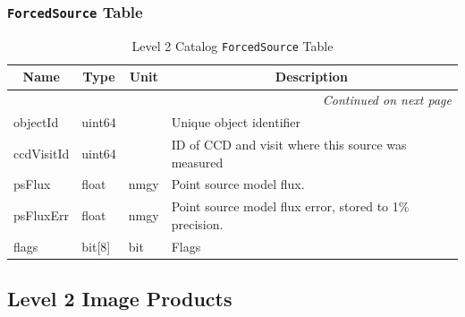 \documentclass[12pt]{article}
\newcommand{\code}[1]{\texttt{#1}}
\newcommand{\ForcedSource}{\code{ForcedSource}\xspace}
\begin{document}
\subsubsection{\ForcedSource Table}
\label{sec:forcedSourceTable}


\begin{center}
\begin{longtable}{p{3cm}p{2cm}p{2cm}p{5cm}}
\caption[\ForcedSource Table]{Level 2 Catalog \ForcedSource Table
} \\

\hline \multicolumn{1}{c}{\bf Name} & \multicolumn{1}{c}{\bf Type} & \multicolumn{1}{c}{\bf Unit} & \multicolumn{1}{c}{\bf Description} \\ \hline
\endhead

\hline \multicolumn{4}{r}{{\em Continued on next page}} \\
\endfoot

\hline\hline
\endlastfoot

objectId & uint64 & ~ & Unique object identifier \\ 

ccdVisitId & uint64 & ~ & ID of CCD and visit where this source was measured \\ 


psFlux & float & nmgy & Point source model flux.\\ 

psFluxErr & float & nmgy & Point source model flux error,  stored to 1\% precision.\\



flags & bit[8] & bit & Flags \\ \hline
\end{longtable}
\end{center}




\subsection{Level 2 Image Products}
\end{document}

